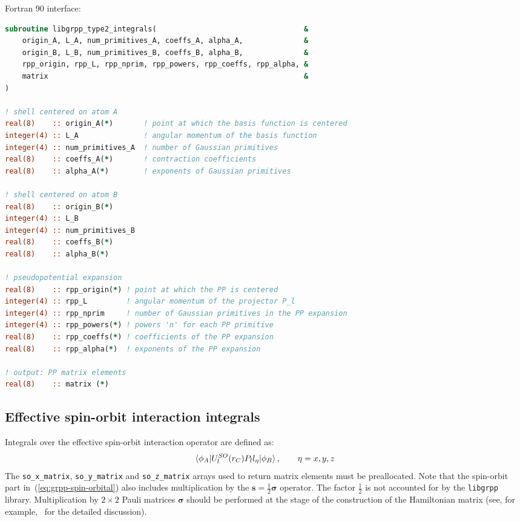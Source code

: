 \documentclass[12pt]{article}
\begin{document}
Fortran 90 interface:
\begin{lstlisting}[language=Fortran]
subroutine libgrpp_type2_integrals(                                  &
    origin_A, L_A, num_primitives_A, coeffs_A, alpha_A,              &
    origin_B, L_B, num_primitives_B, coeffs_B, alpha_B,              &
    rpp_origin, rpp_L, rpp_nprim, rpp_powers, rpp_coeffs, rpp_alpha, &
    matrix                                                           &
)

! shell centered on atom A
real(8)    :: origin_A(*)       ! point at which the basis function is centered
integer(4) :: L_A               ! angular momentum of the basis function
integer(4) :: num_primitives_A  ! number of Gaussian primitives
real(8)    :: coeffs_A(*)       ! contraction coefficients
real(8)    :: alpha_A(*)        ! exponents of Gaussian primitives

! shell centered on atom B
real(8)    :: origin_B(*)
integer(4) :: L_B
integer(4) :: num_primitives_B
real(8)    :: coeffs_B(*)
real(8)    :: alpha_B(*)

! pseudopotential expansion
real(8)    :: rpp_origin(*) ! point at which the PP is centered
integer(4) :: rpp_L         ! angular momentum of the projector P_l
integer(4) :: rpp_nprim     ! number of Gaussian primitives in the PP expansion
integer(4) :: rpp_powers(*) ! powers 'n' for each PP primitive
real(8)    :: rpp_coeffs(*) ! coefficients of the PP expansion
real(8)    :: rpp_alpha(*)  ! exponents of the PP expansion

! output: PP matrix elements
real(8)    :: matrix (*)
\end{lstlisting}


\subsection{Effective spin-orbit interaction integrals}

Integrals over the effective spin-orbit interaction operator are defined as:
%
\begin{equation}
\braket{\phi_A|U^{SO}_l(r_C) P_l l_\eta|\phi_B}, \quad\quad \eta=x,y,z
\label{eq:def-so-ints}
\end{equation}
%
The \texttt{so\_x\_matrix}, \texttt{so\_y\_matrix} and \texttt{so\_z\_matrix} arrays used to return matrix elements must be preallocated. Note that the spin-orbit part in~(\ref{eq:grpp-spin-orbital}) also includes multiplication by the $ \bm{s} = \frac{1}{2}\bm{\sigma}$ operator. The factor $\frac{1}{2}$ is not accounted for by the \texttt{libgrpp} library. Multiplication by $2 \times 2$ Pauli matrices $\bm{\sigma}$ should be performed at the stage of the construction of the Hamiltonian matrix (see, for example,~\cite{Wuellen:10} for the detailed discussion).
\end{document}
